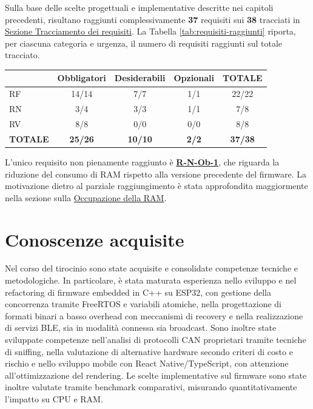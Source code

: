 Sulla base delle scelte progettuali e implementative descritte nei capitoli precedenti, risultano
raggiunti complessivamente \textbf{37} requisiti sui \textbf{38} tracciati in \hyperref[sec:tracciamento_requisiti]{Sezione Tracciamento dei requisiti}. 
La Tabella \ref{tab:requisiti-raggiunti} riporta, per ciascuna categoria e urgenza, il numero di requisiti
raggiunti sul totale tracciato.

\begin{center}
\begin{tabular}{|l|c|c|c|c|}
\hline
 & \textbf{Obbligatori} & \textbf{Desiderabili} & \textbf{Opzionali} & \textbf{TOTALE} \\
\hline
RF & 14/14 & 7/7 & 1/1 & 22/22 \\
\hline
RN & 3/4 & 3/3 & 1/1 & 7/8 \\
\hline
RV & 8/8 & 0/0 & 0/0 & 8/8 \\
\hline
\textbf{TOTALE} & \textbf{25/26} & \textbf{10/10} & \textbf{2/2} & \textbf{37/38} \\
\hline
\end{tabular}
\label{tab:requisiti-raggiunti}
\end{center}

L'unico requisito non pienamente raggiunto è \textbf{\hyperref[req:rn1]{R-N-Ob-1}}, che riguarda 
la riduzione del consumo di RAM rispetto alla versione precedente del firmware. La motivazione 
dietro al parziale raggiungimento è stata approfondita maggiormente nella sezione sulla 
\hyperref[subsubsec:ram-occupazione]{Occupazione della RAM}.

\section{Conoscenze acquisite}
\label{sec:conoscenze-acquisite}
Nel corso del tirocinio sono state acquisite e consolidate competenze tecniche e metodologiche. 
In particolare, è stata maturata esperienza nello sviluppo e nel refactoring di firmware embedded 
in C++ su ESP32, con gestione della concorrenza tramite FreeRTOS e variabili atomiche, nella 
progettazione di formati binari a basso overhead con meccanismi di recovery e nella realizzazione 
di servizi BLE, sia in modalità connessa sia broadcast. Sono inoltre state sviluppate competenze 
nell’analisi di protocolli CAN proprietari tramite tecniche di sniffing, nella valutazione di 
alternative hardware secondo criteri di costo e rischio e nello sviluppo mobile con React 
Native/TypeScript, con attenzione all’ottimizzazione del rendering. Le scelte implementative sul 
firmware sono state inoltre valutate tramite benchmark comparativi, misurando quantitativamente 
l’impatto su CPU e RAM. \\

